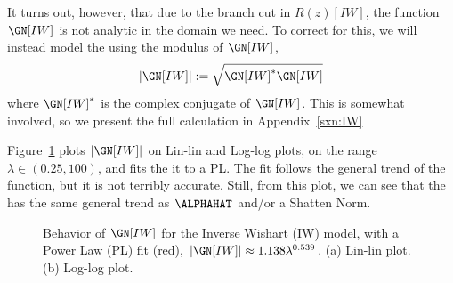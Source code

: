 It turns out, however, that due to the branch cut in $R(z)[IW]$,
the function $\GN[IW]$ is not analytic in the domain we need. 
To correct for this, we will instead model the \LayerQualitySquared using the modulus of $\GN[IW]$,
\begin{equation}
\label{eqn:IW_model_1} 
|\GN[IW]| := \sqrt{\GN[IW]^{*}\GN[IW]}
\end{equation}
where $\GN[IW]^{*}$ is the complex conjugate of $\GN[IW]$.
This is somewhat involved, so we present the full calculation in Appendix~\ref{sxn:IW}


Figure~\ref{fig:InverseWishartGx} plots $|\GN[IW]|$ on Lin-lin and Log-log plots, on the range $\lambda\in(0.25, 100)$, and fits the it to a PL. 
The fit follows the general trend of the function, but it is not terribly accurate.
Still, from this plot, we can see that the \LayerQualitySquared has the same general trend as $\ALPHAHAT$ and/or a Shatten Norm.

\begin{figure}[t]
  \centering
    \caption{Behavior of $\GN[IW]$ for the Inverse Wishart (IW) model,
       with a Power Law (PL) fit (red), $|\GN[IW]|\approx 1.138 \lambda^{0.539}$.
      (a)  Lin-lin plot. (b) Log-log plot.
}
    \label{fig:InverseWishartGx}
\end{figure}


